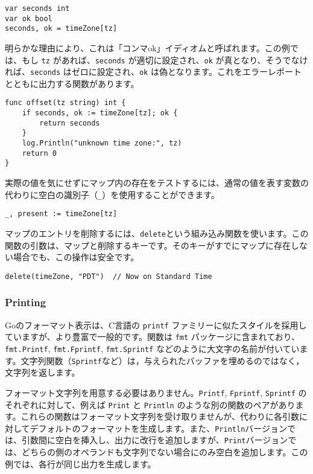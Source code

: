 \documentclass{jsarticle}
\begin{document}
\begin{lstlisting}[numbers=none]
var seconds int
var ok bool
seconds, ok = timeZone[tz]
\end{lstlisting}

明らかな理由により、これは「コンマok」イディオムと呼ばれます。この例では、もし
\texttt{tz} があれば、\texttt{seconds} が適切に設定され、\texttt{ok}
が真となり、そうでなければ、\texttt{seconds}
はゼロに設定され、\texttt{ok}
は偽となります。これをエラーレポートとともに出力する関数があります。

\begin{lstlisting}[numbers=none]
func offset(tz string) int {
    if seconds, ok := timeZone[tz]; ok {
        return seconds
    }
    log.Println("unknown time zone:", tz)
    return 0
}
\end{lstlisting}

実際の値を気にせずにマップ内の存在をテストするには、通常の値を表す変数の代わりに空白の識別子（\texttt{\_}）を使用することができます。

\begin{lstlisting}[numbers=none]
_, present := timeZone[tz]
\end{lstlisting}

マップのエントリを削除するには、\texttt{delete}という組み込み関数を使います。この関数の引数は、マップと削除するキーです。そのキーがすでにマップに存在しない場合でも、この操作は安全です。

\begin{lstlisting}[numbers=none]
delete(timeZone, "PDT")  // Now on Standard Time
\end{lstlisting}

\subsubsection{Printing}

Goのフォーマット表示は、C言語の \texttt{printf}
ファミリーに似たスタイルを採用していますが、より豊富で一般的です。関数は
\texttt{fmt} パッケージに含まれており、\texttt{fmt.Printf},
\texttt{fmt.Fprintf}, \texttt{fmt.Sprintf}
などのように大文字の名前が付いています。文字列関数（\texttt{Sprintf}など）は，与えられたバッファを埋めるのではなく，文字列を返します。

フォーマット文字列を用意する必要はありません。\texttt{Printf},
\texttt{Fprintf}, \texttt{Sprintf} のそれぞれに対して、例えば
\texttt{Print} と \texttt{Println}
のような別の関数のペアがあります。これらの関数はフォーマット文字列を受け取りませんが、代わりに各引数に対してデフォルトのフォーマットを生成します。また、\texttt{Println}バージョンでは、引数間に空白を挿入し、出力に改行を追加しますが、\texttt{Print}バージョンでは、どちらの側のオペランドも文字列でない場合にのみ空白を追加します。この例では、各行が同じ出力を生成します。
\end{document}
